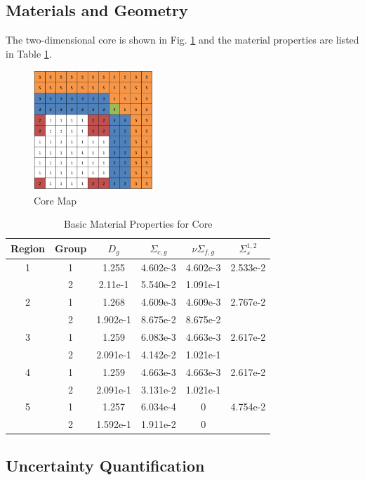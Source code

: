 \subsection{Materials and Geometry}
The two-dimensional core is shown in Fig. \ref{coremap} and the material properties are listed in Table \ref{tab:coremats}.
\begin{figure}[H]
\centering
   \includegraphics[width=0.4\textwidth]{../graphics/core}
   \caption{Core Map}
   \label{coremap}
\end{figure}
\begin{table}[H]
\centering
\begin{tabular}{c c | c c c c}
Region & Group & $D_g$ & $\Sigma_{c,g}$ & $\nu\Sigma_{f,g}$ & $\Sigma_s^{1,2}$ \\ \hline
1 & 1 & 1.255    & 4.602e-3 & 4.602e-3 & 2.533e-2 \\
  & 2 & 2.11e-1  & 5.540e-2 & 1.091e-1 & \\ \hline
2 & 1 & 1.268    & 4.609e-3 & 4.609e-3 & 2.767e-2 \\
  & 2 & 1.902e-1 & 8.675e-2 & 8.675e-2 & \\ \hline
3 & 1 & 1.259    & 6.083e-3 & 4.663e-3 & 2.617e-2 \\
  & 2 & 2.091e-1 & 4.142e-2 & 1.021e-1 & \\ \hline
4 & 1 & 1.259    & 4.663e-3 & 4.663e-3 & 2.617e-2 \\
  & 2 & 2.091e-1 & 3.131e-2 & 1.021e-1 & \\ \hline
5 & 1 & 1.257    & 6.034e-4  & 0 & 4.754e-2 \\
  & 2 & 1.592e-1 & 1.911e-2  & 0 & 
\end{tabular}
\caption{Basic Material Properties for Core}
\label{tab:coremats}
\end{table}

\subsection{Uncertainty Quantification}
